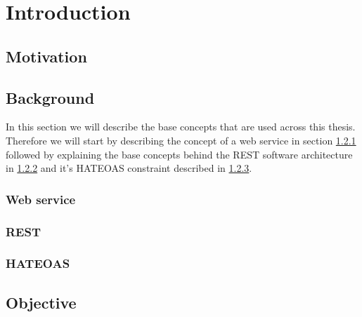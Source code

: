 \chapter{Introduction}
\label{chapter:intro}

\section{Motivation}
\label{sec:motivation}


\section{Background}
\label{sec:background}

In this section we will describe the base concepts that are used across this thesis. Therefore we will start by describing the concept of a web service in section \ref{sub-sec:web-service} followed by explaining the base concepts behind the REST software architecture in \ref{sub-sec:rest} and it's HATEOAS constraint described in \ref{sub-sec:hateoas}.

\subsection{Web service}
\label{sub-sec:web-service}


\subsection{REST}
\label{sub-sec:rest}



\subsection{HATEOAS}
\label{sub-sec:hateoas}



\section{Objective}
\label{sec:objective}

